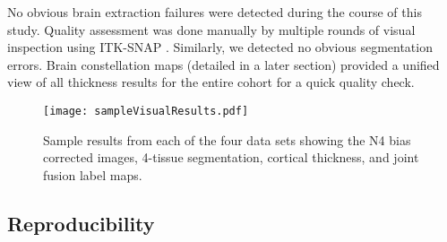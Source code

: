 No obvious brain extraction failures  were detected during the course of this study.  
Quality assessment was done manually by multiple rounds of visual inspection using 
ITK-SNAP \cite{yushkevich2006}.  Similarly, we detected no obvious segmentation errors.  Brain constellation maps (detailed in a later section)
provided a unified view of all thickness results for the entire cohort for
a quick quality check.

\begin{figure*}[htb]
  \begin{center}
  \texttt{[image: sampleVisualResults.pdf]}
  \caption{Sample results from each of the four data sets showing the N4 bias
  corrected images, 4-tissue segmentation, cortical thickness, and 
  joint fusion label maps.}
  \label{fig:sampleResults}
  \end{center}
\end{figure*}
  
  
\subsection{Reproducibility}%

